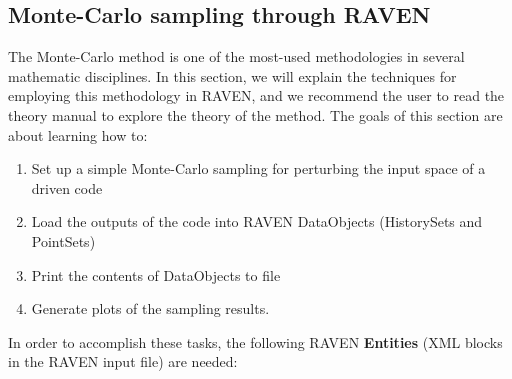 \subsection{Monte-Carlo sampling through RAVEN}
\label{sub:MCexample}
The Monte-Carlo method is one of the most-used methodologies in several mathematic disciplines. In this section,
we will explain the techniques for employing this methodology in RAVEN, and we recommend the user to read the
theory manual to explore the theory of the method.
The goals of this section are about learning how to:
 \begin{enumerate}
   \item Set up a simple Monte-Carlo sampling for perturbing the input space of a driven code
   \item Load the outputs of the code into RAVEN DataObjects (HistorySets and PointSets)
   \item Print the contents of DataObjects to file
   \item Generate plots of the sampling results.
\end{enumerate}
In order to accomplish these tasks, the following RAVEN \textbf{Entities} (XML blocks in the RAVEN input file) are needed:
